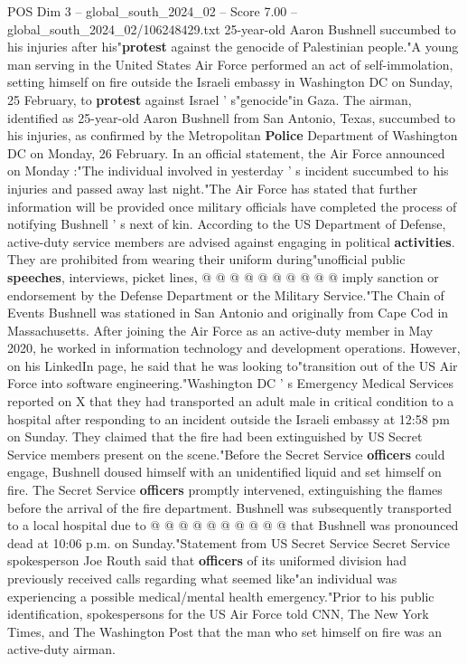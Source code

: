 \begin{textsample}{POS Dim 3 – global\_south\_2024\_02 – Score 7.00 – global\_south\_2024\_02/106248429.txt}  \label{ex:f3_pos_375}
25-year-old Aaron Bushnell succumbed to his injuries after his"\textbf{protest} against the genocide of Palestinian people."A young man serving in the United States Air Force performed an act of self-immolation, setting himself on fire outside the Israeli embassy in Washington DC on Sunday, 25 February, to \textbf{protest} against Israel ' s"genocide"in Gaza.
The airman, identified as 25-year-old Aaron Bushnell from San Antonio, Texas, succumbed to his injuries, as confirmed by the Metropolitan \textbf{Police} Department of Washington DC on Monday, 26 February.
In an official statement, the Air Force announced on Monday :"The individual involved in yesterday ' s incident succumbed to his injuries and passed away last night."The Air Force has stated that further information will be provided once military officials have completed the process of notifying Bushnell ' s next of kin.
According to the US Department of Defense, active-duty service members are advised against engaging in political \textbf{activities}.
They are prohibited from wearing their uniform during"unofficial public \textbf{speeches}, interviews, picket lines, @ @ @ @ @ @ @ @ @ @ imply sanction or endorsement by the Defense Department or the Military Service."The Chain of Events Bushnell was stationed in San Antonio and originally from Cape Cod in Massachusetts.
After joining the Air Force as an active-duty member in May 2020, he worked in information technology and development operations.
However, on his LinkedIn page, he said that he was looking to"transition out of the US Air Force into software engineering."Washington DC ' s Emergency Medical Services reported on X that they had transported an adult male in critical condition to a hospital after responding to an incident outside the Israeli embassy at 12:58 pm on Sunday.
They claimed that the fire had been extinguished by US Secret Service members present on the scene."Before the Secret Service \textbf{officers} could engage, Bushnell doused himself with an unidentified liquid and set himself on fire.
The Secret Service \textbf{officers} promptly intervened, extinguishing the flames before the arrival of the fire department.
Bushnell was subsequently transported to a local hospital due to @ @ @ @ @ @ @ @ @ @ that Bushnell was pronounced dead at 10:06 p.m. on Sunday."Statement from US Secret Service Secret Service spokesperson Joe Routh said that \textbf{officers} of its uniformed division had previously received calls regarding what seemed like"an individual was experiencing a possible medical/mental health emergency."Prior to his public identification, spokespersons for the US Air Force told CNN, The New York Times, and The Washington Post that the man who set himself on fire was an active-duty airman.

\end{textsample}
